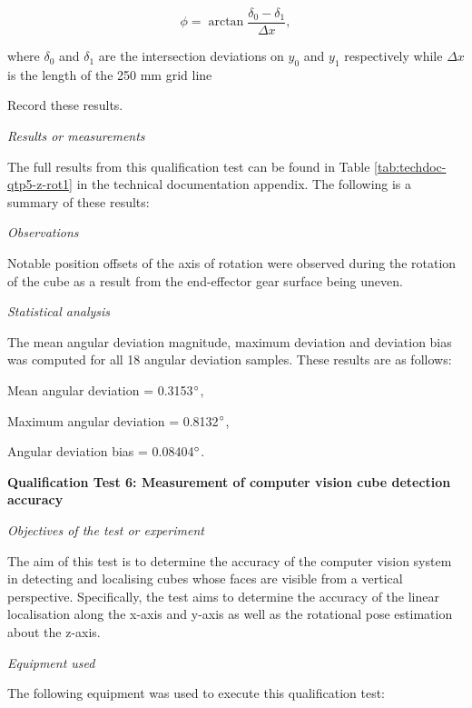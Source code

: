 \begin{compactenum}
\begin{equation}
	\phi=\arctan\frac{\delta_0-\delta_1}{\Delta x},
\end{equation}

	where $\delta_0$ and $\delta_1$ are the intersection deviations on $y_0$ and $y_1$ respectively while $\Delta x$ is the length of the 250 mm grid line
	\item Record these results.
\end{compactenum}

\textit{Results or measurements}

The full results from this qualification test can be found in Table \ref{tab:techdoc-qtp5-z-rot1} in the technical documentation appendix. The following is a summary of these results:

\textit{Observations}

Notable position offsets of the axis of rotation were observed during the rotation of the cube as a result from the end-effector gear surface being uneven.

\textit{Statistical analysis}

The mean angular deviation magnitude, maximum deviation and deviation bias was computed for all 18 angular deviation samples. These results are as follows:

\begin{compactitem}
	\item Mean angular deviation = 0.3153$^{\circ}$,
	\item Maximum angular deviation = 0.8132$^{\circ}$,
	\item Angular deviation bias = 0.08404$^{\circ}$.
\end{compactitem}

\textbf{Qualification Test 6: Measurement of computer vision cube detection accuracy}

\textit{Objectives of the test or experiment}

The aim of this test is to determine the accuracy of the computer vision system in detecting and localising cubes whose faces are visible from a vertical perspective. Specifically, the test aims to determine the accuracy of the linear localisation along the x-axis and y-axis as well as the rotational pose estimation about the z-axis.

\textit{Equipment used}

The following equipment was used to execute this qualification test:

